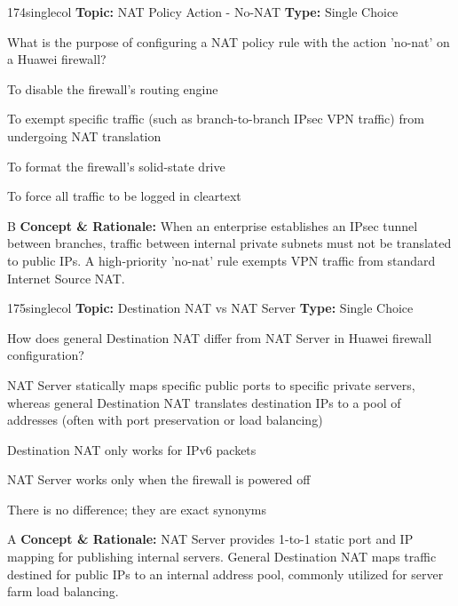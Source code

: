\begin{qcard}{174}{singlecol}
\textcolor{darkslate!75}{\small\textbf{Topic:} NAT Policy Action - No-NAT \hfill \textbf{Type:} Single Choice}\vspace{0.4em}\par
What is the purpose of configuring a NAT policy rule with the action 'no-nat' on a Huawei firewall?
\begin{qoptions}
\item To disable the firewall's routing engine
\item To exempt specific traffic (such as branch-to-branch IPsec VPN traffic) from undergoing NAT translation
\item To format the firewall's solid-state drive
\item To force all traffic to be logged in cleartext
\end{qoptions}
\end{qcard}
\nopagebreak
\begin{explainbox}{B}
\textbf{Concept \& Rationale:} When an enterprise establishes an IPsec tunnel between branches, traffic between internal private subnets must not be translated to public IPs. A high-priority 'no-nat' rule exempts VPN traffic from standard Internet Source NAT.
\end{explainbox}

\begin{qcard}{175}{singlecol}
\textcolor{darkslate!75}{\small\textbf{Topic:} Destination NAT vs NAT Server \hfill \textbf{Type:} Single Choice}\vspace{0.4em}\par
How does general Destination NAT differ from NAT Server in Huawei firewall configuration?
\begin{qoptions}
\item NAT Server statically maps specific public ports to specific private servers, whereas general Destination NAT translates destination IPs to a pool of addresses (often with port preservation or load balancing)
\item Destination NAT only works for IPv6 packets
\item NAT Server works only when the firewall is powered off
\item There is no difference; they are exact synonyms
\end{qoptions}
\end{qcard}
\nopagebreak
\begin{explainbox}{A}
\textbf{Concept \& Rationale:} NAT Server provides 1-to-1 static port and IP mapping for publishing internal servers. General Destination NAT maps traffic destined for public IPs to an internal address pool, commonly utilized for server farm load balancing.
\end{explainbox}

